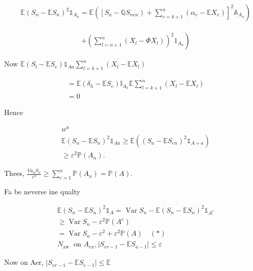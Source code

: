 \documentclass[11pt]{amsbook}
\theoremstyle{plain}%
\theoremstyle{definition}
\theoremstyle{remark}
\begin{document}
$$
\begin{aligned}
& \left.\mathbb{E}\left(S_{n}-\mathbb{E} S_{n}\right)^{2} \mathbb{1}_{A_{n}}=\mathbb{E}\left(\left[S_{a}-\mathbb{Q} S_{n e n}\right)+\sum_{e=k+1}^{n}\left(\alpha_{e}-\mathbb{E} X_{e}\right)\right]^{2} \mathbb{A}_{A_{n}}\right)
\end{aligned}
$$

$$
\begin{aligned}
& \left.+\left(\sum_{l=n+1}^{n}\left(X_{l}-\Phi X_{l}\right)\right)^{2} 1_{A_{n}}\right)
\end{aligned}
$$

Now $\mathbb{E}\left(S_{l}-\mathbb{E} S_{e}\right) \mathbb{1}_{A a} \sum_{l=h+1}^{n}\left(X_{l}-\mathbb{E} X_{l}\right)$

$$
\begin{aligned}
& =\mathbb{E}\left(\delta_{h}-\mathbb{E} S_{e}\right) \mathbb{I}_{A_{h}} \mathbb{E} \sum_{l=k+1}^{n}\left(X_{l}-\mathbb{E} X_{l}\right) \\
& =0
\end{aligned}
$$

Hence

$$
\begin{aligned}
& w^{a} \\
& \mathbb{E}\left(S_{n}-\mathbb{E} S_{n}\right)^{2} \mathbb{1}_{A a} \geqslant \mathbb{E}\left(\left(S_{a}-\mathbb{E} S_{e n}\right)^{2} \mathbb{1}_{A+a}\right) \\
& \geqslant \varepsilon^{2} \mathbb{P}\left(A_{n}\right) .
\end{aligned}
$$

Thees, $\frac{V a_{n} S_{n}}{\varepsilon^{2}} \geqslant \sum_{e=1}^{n} \mathbb{P}\left(A_{n}\right)=\mathbb{P}(A)$.

Fa be neverse ine qualty

$$
\begin{aligned}
& \mathbb{E}\left(S_{n}-\mathbb{E} S_{n}\right)^{2} \mathbb{1}_{A}=\operatorname{Var} S_{n}-\mathbb{E}\left(S_{n}-\mathbb{E} S_{n}\right)^{2} \mathbb{1}_{A^{c}} \\
& \geqslant \operatorname{Var} S_{n}-\varepsilon^{2} \mathbb{P}\left(A^{c}\right) \\
&=\operatorname{Var} S_{n}-\varepsilon^{2}+\varepsilon^{2} \mathbb{P}(A) \quad(*) \\
& N_{\text {aw }} \text { on } A_{e n},\left|S_{e r-1}-\mathbb{E} S_{a-1}\right| \leq \varepsilon
\end{aligned}
$$

Now on Aer, $\left|S_{e r-1}-\mathbb{E} S_{e-1}\right| \leq \mathbb{E}$
\end{document}
